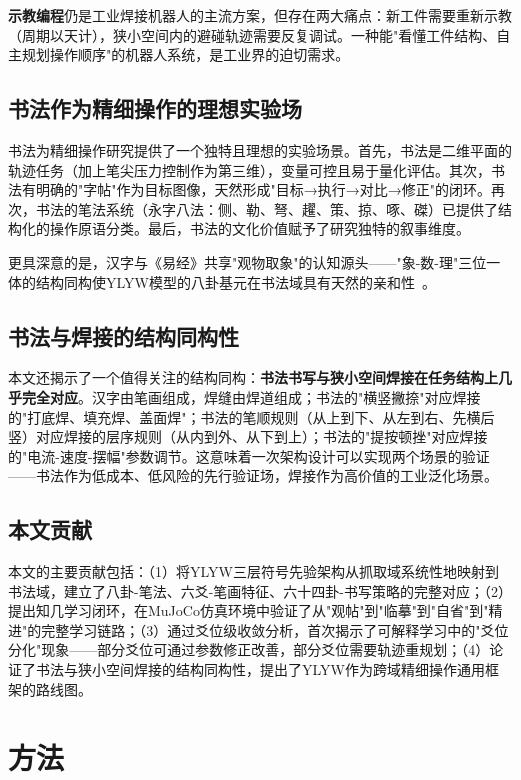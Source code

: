 \documentclass[12pt,a4paper]{article}
\begin{document}
\textbf{示教编程}仍是工业焊接机器人的主流方案，但存在两大痛点：新工件需要重新示教（周期以天计），狭小空间内的避碰轨迹需要反复调试。一种能"看懂工件结构、自主规划操作顺序"的机器人系统，是工业界的迫切需求。

\subsection{书法作为精细操作的理想实验场}

书法为精细操作研究提供了一个独特且理想的实验场景。首先，书法是二维平面的轨迹任务（加上笔尖压力控制作为第三维），变量可控且易于量化评估。其次，书法有明确的"字帖"作为目标图像，天然形成"目标→执行→对比→修正"的闭环。再次，书法的笔法系统（永字八法：侧、勒、弩、趯、策、掠、啄、磔）已提供了结构化的操作原语分类。最后，书法的文化价值赋予了研究独特的叙事维度。

更具深意的是，汉字与《易经》共享"观物取象"的认知源头——"象-数-理"三位一体的结构同构使YLYW模型的八卦基元在书法域具有天然的亲和性~\cite{ma2024shufa}。

\subsection{书法与焊接的结构同构性}

本文还揭示了一个值得关注的结构同构：\textbf{书法书写与狭小空间焊接在任务结构上几乎完全对应}。汉字由笔画组成，焊缝由焊道组成；书法的"横竖撇捺"对应焊接的"打底焊、填充焊、盖面焊"；书法的笔顺规则（从上到下、从左到右、先横后竖）对应焊接的层序规则（从内到外、从下到上）；书法的"提按顿挫"对应焊接的"电流-速度-摆幅"参数调节。这意味着一次架构设计可以实现两个场景的验证——书法作为低成本、低风险的先行验证场，焊接作为高价值的工业泛化场景。

\subsection{本文贡献}

本文的主要贡献包括：（1）将YLYW三层符号先验架构从抓取域系统性地映射到书法域，建立了八卦-笔法、六爻-笔画特征、六十四卦-书写策略的完整对应；（2）提出知几学习闭环，在MuJoCo仿真环境中验证了从"观帖"到"临摹"到"自省"到"精进"的完整学习链路；（3）通过爻位级收敛分析，首次揭示了可解释学习中的"爻位分化"现象——部分爻位可通过参数修正改善，部分爻位需要轨迹重规划；（4）论证了书法与狭小空间焊接的结构同构性，提出了YLYW作为跨域精细操作通用框架的路线图。

\section{方法}
\end{document}
